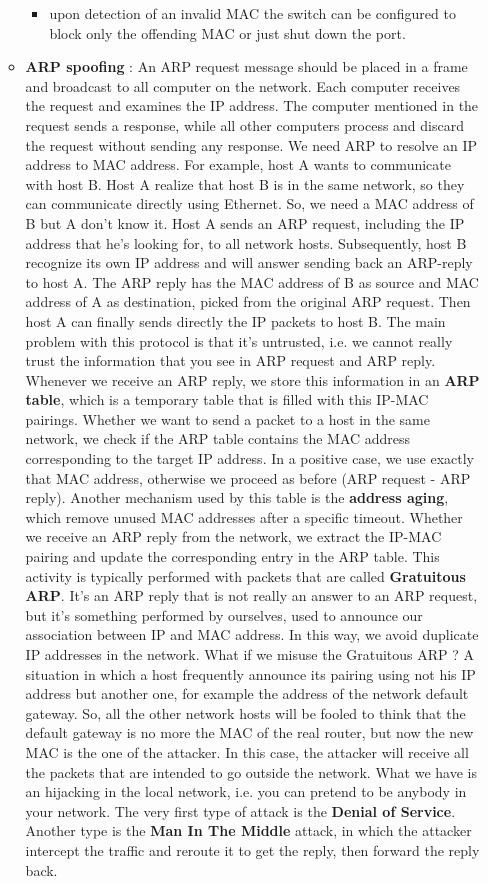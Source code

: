 \documentclass[11pt]{article}
\begin{document}
\begin{itemize}
\begin{itemize}
\begin{itemize}
\item upon detection of an invalid MAC the switch can be configured to block only the offending MAC or just shut down the port.
\end{itemize}
\item \textbf{ARP spoofing} : An ARP request message should be placed in a frame and broadcast to all computer on the network. Each computer receives the request and examines the IP address. The computer mentioned in the request sends a response, while all other computers process and discard the request without sending any response. We need ARP to resolve an IP address to MAC address. For example, host A wants to communicate with host B. Host A realize that host B is in the same network, so they can communicate directly using Ethernet. So, we need a MAC address of B but A don't know it. Host A sends an ARP request, including the IP address that he's looking for, to all network hosts. Subsequently, host B recognize its own IP address and will answer sending back an ARP-reply to host A. The ARP reply has the MAC address of B as source and MAC address of A as destination, picked from the original ARP request. Then host A can finally sends directly the IP packets to host B. The main problem with this protocol is that it's untrusted, i.e. we cannot really trust the information that you see in ARP request and ARP reply. Whenever we receive an ARP reply, we store this information in an \textbf{ARP table}, which is a temporary table that is filled with this IP-MAC pairings. Whether we want to send a packet to a host in the same network, we check if the ARP table contains the MAC address corresponding to the target IP address. In a positive case, we use exactly that MAC address, otherwise we proceed as before (ARP request - ARP reply). Another mechanism used by this table is the \textbf{address aging}, which remove unused MAC addresses after a specific timeout. Whether we receive an ARP reply from the network, we extract the IP-MAC pairing and update the corresponding entry in the ARP table. This activity is typically performed with packets that are called \textbf{Gratuitous ARP}. It's an ARP reply that is not really an answer to an ARP request, but it's something performed by ourselves, used to announce our association between IP and MAC address. In this way, we avoid duplicate IP addresses in the network. What if we misuse the Gratuitous ARP ? A situation in which a host frequently announce its pairing using not his IP address but another one, for example the address of the network default gateway. So, all the other network hosts will be fooled to think that the default gateway is no more the MAC of the real router, but now the new MAC is the one of the attacker. In this case, the attacker will receive all the packets that are intended to go outside the network. What we have is an hijacking in the local network, i.e. you can pretend to be anybody in your network. The very first type of attack is the \textbf{Denial of Service}. Another type is the \textbf{Man In The Middle} attack, in which the attacker intercept the traffic and reroute it to get the reply, then forward the reply back.

\end{itemize}
\end{itemize}
\end{document}
